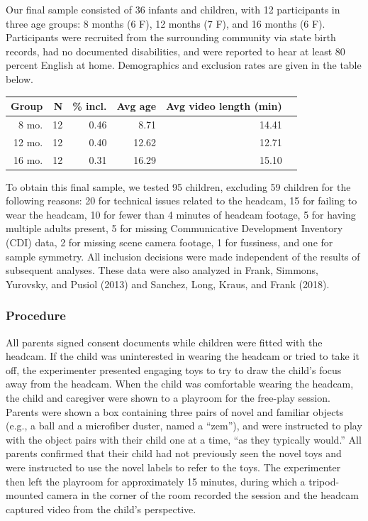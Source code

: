 \documentclass[english,man,floatsintext]{apa6}
\begin{document}
Our final sample consisted of 36 infants and children, with 12
participants in three age groups: 8 months (6 F), 12 months (7 F), and
16 months (6 F). Participants were recruited from the surrounding
community via state birth records, had no documented disabilities, and
were reported to hear at least 80 percent English at home. Demographics
and exclusion rates are given in the table below.

\begin{table}[ht]
\centering
\begin{tabular}{rrrrrr}
\hline
Group & N & \% incl. & Avg age & Avg video length (min) \\
\hline
8 mo. &   12 & 0.46 & 8.71 & 14.41 \\
12 mo. &  12 & 0.40 & 12.62 & 12.71 \\
16 mo. &  12 & 0.31 & 16.29 & 15.10\\
\hline
\end{tabular}
\end{table}

To obtain this final sample, we tested 95 children, excluding 59
children for the following reasons: 20 for technical issues related to
the headcam, 15 for failing to wear the headcam, 10 for fewer than 4
minutes of headcam footage, 5 for having multiple adults present, 5 for
missing Communicative Development Inventory (CDI) data, 2 for missing
scene camera footage, 1 for fussiness, and one for sample symmetry. All
inclusion decisions were made independent of the results of subsequent
analyses. These data were also analyzed in Frank, Simmons, Yurovsky, and
Pusiol (2013) and Sanchez, Long, Kraus, and Frank (2018).

\subsubsection{Procedure}\label{procedure}

All parents signed consent documents while children were fitted with the
headcam. If the child was uninterested in wearing the headcam or tried
to take it off, the experimenter presented engaging toys to try to draw
the child's focus away from the headcam. When the child was comfortable
wearing the headcam, the child and caregiver were shown to a playroom
for the free-play session. Parents were shown a box containing three
pairs of novel and familiar objects (e.g., a ball and a microfiber
duster, named a \enquote{zem}), and were instructed to play with the
object pairs with their child one at a time, \enquote{as they typically
would.} All parents confirmed that their child had not previously seen
the novel toys and were instructed to use the novel labels to refer to
the toys. The experimenter then left the playroom for approximately 15
minutes, during which a tripod-mounted camera in the corner of the room
recorded the session and the headcam captured video from the child's
perspective.
\end{document}

